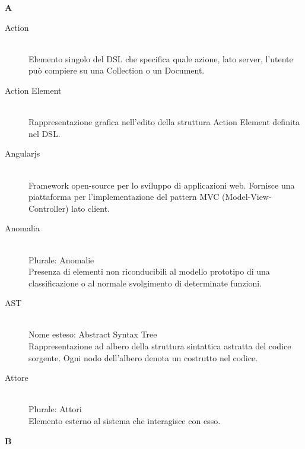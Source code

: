 \newpage 
\begin{center}\textbf{\Huge{A}}\end{center}
\begin{description}\item[Action] \hfill \\
Elemento singolo del DSL che specifica quale azione, lato server, l'utente può compiere su una Collection o un Document.
 \item[Action Element] \hfill \\
Rappresentazione grafica nell'edito della struttura Action Element definita nel DSL.
 \item[Angularjs] \hfill \\
Framework open-source per lo sviluppo di applicazioni web. Fornisce una piattaforma per l'implementazione del pattern MVC (Model-View-Controller) lato client.
 \item[Anomalia] \hfill \\
Plurale: Anomalie\\ 
Presenza di elementi non riconducibili al modello prototipo di una classificazione o al normale svolgimento di determinate funzioni.
 \item[AST] \hfill \\
Nome esteso: Abstract Syntax Tree\\ 
Rappresentazione ad albero della struttura sintattica astratta del codice sorgente. Ogni nodo dell'albero denota un costrutto nel codice.
 \item[Attore] \hfill \\
Plurale: Attori\\ 
Elemento esterno al sistema che interagisce con esso.
 \end{description}
\newpage 
\begin{center}\textbf{\Huge{B}}\end{center}
